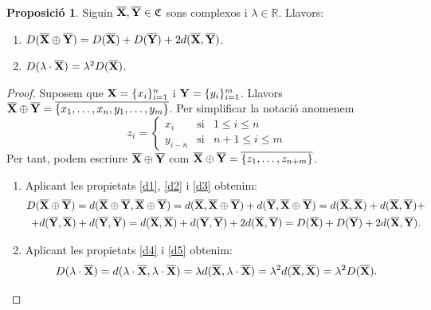 \documentclass{article}
\theoremstyle{definition}
\newtheorem{prop}[definition]{Proposició}
\newcommand{\0}{\ensuremath{\vb{0}}}
\newcommand{\X}{\ensuremath{\vb{X}}}
\newcommand{\Y}{\ensuremath{\vb{Y}}}
\newcommand{\RR}{\ensuremath{\mathbb{R}}} %
\begin{document}
\begin{prop}
    Siguin $\overline{\X},\overline{\Y}\in\mathfrak{C}$ sons complexos i $\lambda\in\RR$. Llavors:
    \begin{enumerate}[label=$D$\arabic*),ref=$D$\arabic*]
        \item\label{D1} $D(\overline{\X}\oplus\overline{\Y})=D(\overline{\X})+D(\overline{\Y})+2d(\overline{\X},\overline{\Y})$.
        \item\label{D2} $D(\lambda\cdot \overline{\X})=\lambda^2D(\overline{\X})$.
    \end{enumerate}
\end{prop}
\begin{proof}
    Suposem que $\X=\{x_i\}_{i=1}^n$ i $\Y=\{y_i\}_{i=1}^m$. Llavors $\overline{\X}\oplus\overline{\Y}=\overline{\{x_1,\ldots,x_n,y_1,\ldots,y_m\}}$. Per simplificar la notació anomenem $$
    z_i=\left\{
    \begin{array}{ccc}
        x_i & \text{si} & 1\leq i\leq n\\
        y_{i-n} & \text{si} & n+1\leq i\leq m
    \end{array}\right.
    $$ Per tant, podem escriure $\overline{\X}\oplus\overline{\Y}$ com $\overline{\X}\oplus\overline{\Y}=\overline{\{z_1,\ldots,z_{n+m}\}}$.
    \begin{enumerate}[label=$D$\arabic*)]
        \item Aplicant les propietats \ref{d1}, \ref{d2} i \ref{d3} obtenim:
        \begin{multline*}
            D(\overline{\X}\oplus\overline{\Y})=d(\overline{\X}\oplus\overline{\Y},\overline{\X}\oplus\overline{\Y})=d(\overline{\X},\overline{\X}\oplus\overline{\Y})+d(\overline{\Y},\overline{\X}\oplus\overline{\Y})=d(\overline{\X},\overline{\X})+d(\overline{\X},\overline{\Y})+\\+d(\overline{\Y},\overline{\X})+d(\overline{\Y},\overline{\Y})=d(\overline{\X},\overline{\X})+d(\overline{\Y},\overline{\Y})+2d(\overline{\X},\overline{\Y})=D(\overline{\X})+D(\overline{\Y})+2d(\overline{\X},\overline{\Y}).
        \end{multline*}
        \item Aplicant les propietats \ref{d4} i \ref{d5} obtenim: $$D(\lambda\cdot\overline{\X})=d(\lambda\cdot\overline{\X},\lambda\cdot\overline{\X})=\lambda d(\overline{\X},\lambda\cdot\overline{\X})=\lambda^2d(\overline{\X},\overline{\X})=\lambda^2D(\overline{\X}).$$
    \end{enumerate}
\end{proof}
\end{document}
